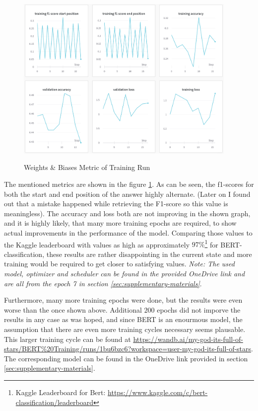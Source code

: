         \begin{figure}[h!]
            \centering
            \caption{Weights \& Biases Metric of Training Run \cite{wandbScreenshot}}
            \includegraphics[width=0.95\textwidth]{figures/wandb_metrics.png}
            \label{fig:-wandb-metric}
        \end{figure}
        The mentioned metrics are shown in the figure \ref{fig:-wandb-metric}.
        As can be seen, the f1-scores for both the start and end position of the answer highly alternate. (Later on I found out that a mistake happened while retrieving the F1-score so this value is meaningless). The accuracy and loss both are not improving in the shown graph, and it is highly likely, that many more training epochs are required, to show actual improvements in the performance of the model.
        Comparing those values to the Kaggle leaderboard with values as high as approximately $97\%$\footnote{Kaggle Leaderboard for Bert: \url{https://www.kaggle.com/c/bert-classification/leaderboard}} for BERT-classification, these results are rather disappointing in the current state and more training would be required to get closer to satisfying values.
        \emph{Note: The used model, optimizer and scheduler can be found in the provided OneDrive link and are all from the epoch 7 in section \ref{sec:supplementary-materials}}.

        Furthermore, many more training epochs were done, but the results were even worse than the once shown above.
        Additional $200$ epochs did not imporve the results in any case as was hoped, and since BERT is an enourmous model, the assumption that there are even more training cycles necessary seems plausable.
        This larger training cycle can be found at \url{https://wandb.ai/my-god-its-full-of-stars/BERT%20Training/runs/1bu6bzc6?workspace=user-my-god-its-full-of-stars}. The corresponding model can be found in the OneDrive link provided in section \ref{sec:supplementary-materials}.

